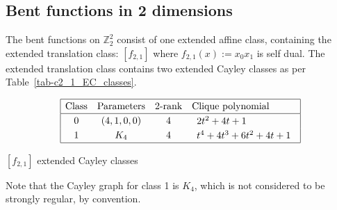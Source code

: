 \documentclass[12pt,a4paper]{article}
\newcommand{\mb}[1]{\mathbb{#1}}
\newcommand{\Z}{\mb{Z}}
\begin{document}
\subsection{Bent functions in 2 dimensions}
%
The bent functions on $\Z_2^2$ consist of one extended affine class, containing the extended translation class: $[f_{2,1}]$
where $f_{2,1}(x) := x_0 x_1$ is self dual.
The extended translation class contains two extended Cayley classes as per Table~\ref{tab-c2_1_EC_classes}.
\begin{table}[!bhpt] %
\small{
\begin{align*}
\def\arraystretch{1.2}
\begin{array}{|cccl|}
\hline
\text{Class} &
\text{Parameters} &
\text{2-rank} &
\text{Clique polynomial}
\\
\hline
0 &
(4, 1, 0, 0) &
4 &
\begin{array}{l}
2t^{2} + 4t + 1
\end{array}
\\
1 &
K_4 &
4 &
\begin{array}{l}
t^{4} + 4t^{3} + 6t^{2} + 4t + 1
\end{array}
\\
\hline
\end{array}
\end{align*}
}
\caption{$[f_{2,1}]$ extended Cayley classes}
\label{tab-c2_1_EC_classes}
\end{table}

Note that the Cayley graph for class 1 is $K_4$, which is not considered to be strongly regular, by convention.
\end{document}
